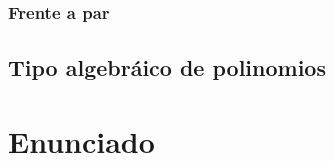 \documentclass[12pt]{article}
\begin{document}


\subsubsection{Frente a par}



\subsection{Tipo algebráico de polinomios}



\clearpage
\appendix

\section{Enunciado}


\end{document}
